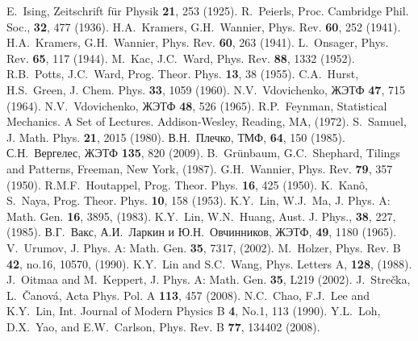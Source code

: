 \documentclass[utf8,12pt]{jetp}
\begin{document}
	
\begin{references}

 E.~Ising, Zeitschrift für Physik \textbf{21}, 253 (1925).
 R.~Peierls, Proc. Cambridge Phil. Soc., \textbf{32}, 477 (1936).
  H.A.~Kramers, G.H.~Wannier, Phys. Rev. \textbf{60}, 252 (1941).
  H.A.~Kramers, G.H.~Wannier, Phys. Rev. \textbf{60}, 263 (1941).
  L.~Onsager, Phys. Rev. \textbf{65}, 117 (1944).
 M.~Kac, J.C.~Ward, Phys. Rev. \textbf{88}, 1332 (1952).
 R.B.~Potts, J.C.~Ward, Prog. Theor. Phys. \textbf{13}, 38 (1955).
 C.A.~Hurst, H.S.~Green, J. Chem. Phys. \textbf{33}, 1059 (1960).
 N.V.~Vdovichenko, ЖЭТФ \textbf{47}, 715 (1964).
 N.V.~Vdovichenko, ЖЭТФ \textbf{48}, 526 (1965).
 R.P.~Feynman, Statistical Mechanics. A Set of Lectures. Addison-Wesley, Reading, MA, (1972).
 S.~Samuel, J. Math. Phys. \textbf{21}, 2015 (1980).
 В.Н.~Плечко, ТМФ, \textbf{64}, 150 (1985).
 С.Н.~Вергелес, ЖЭТФ \textbf{135}, 820 (2009).
 B.~Grünbaum, G.C.~Shephard, Tilings and Patterns, Freeman, New York, (1987).
  G.H.~Wannier, Phys. Rev. \textbf{79}, 357 (1950).
 R.M.F.~Houtappel, Prog. Theor. Phys. \textbf{16}, 425 (1950).
  K.~Kanô, S.~Naya, Prog. Theor. Phys. \textbf{10}, 158 (1953).
 K.Y.~Lin, W.J.~Ma, J. Phys. A: Math. Gen. \textbf{16}, 3895, (1983).
 K.Y.~Lin, W.N.~Huang, Aust. J. Phys., \textbf{38}, 227, (1985).
 В.Г.~Вакс, А.И.~Ларкин и Ю.Н.~Овчинников, ЖЭТФ, \textbf{49}, 1180 (1965).
 V.~Urumov, J. Phys. A: Math. Gen. \textbf{35}, 7317, (2002).
 M.~Holzer, Phys. Rev. B \textbf{42}, no.16, 10570, (1990).
 K.Y.~Lin and S.C.~Wang, Phys. Letters A, \textbf{128}, (1988).
 J.~Oitmaa and M.~Keppert, J. Phys. A: Math. Gen. \textbf{35}, L219 (2002).
 J.~Strečka, L.~Čanová, Acta Phys. Pol. A \textbf{113}, 457 (2008). 
 N.C.~Chao, F.J.~Lee and K.Y.~Lin, Int. Journal of Modern Physics B \textbf{4}, No.1, 113 (1990).
 Y.L.~Loh, D.X.~Yao, and E.W.~Carlson, Phys. Rev. B \textbf{77}, 134402 (2008).

\end{references}
\end{document}
